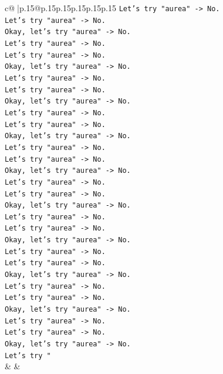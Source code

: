 \documentclass{article}
\begin{document}
{\begin{supertabular}{c@{$\;$}|p{.15\linewidth}@{}p{.15\linewidth}p{.15\linewidth}p{.15\linewidth}p{.15\linewidth}p{.15\linewidth}}
{{{\texttt{Let's try "aurea" {-}> No.} \\
\texttt{Let's try "aurea" {-}> No.} \\
\texttt{Okay, let's try "aurea" {-}> No.} \\
\texttt{Let's try "aurea" {-}> No.} \\
\texttt{Let's try "aurea" {-}> No.} \\
\texttt{Okay, let's try "aurea" {-}> No.} \\
\texttt{Let's try "aurea" {-}> No.} \\
\texttt{Let's try "aurea" {-}> No.} \\
\texttt{Okay, let's try "aurea" {-}> No.} \\
\texttt{Let's try "aurea" {-}> No.} \\
\texttt{Let's try "aurea" {-}> No.} \\
\texttt{Okay, let's try "aurea" {-}> No.} \\
\texttt{Let's try "aurea" {-}> No.} \\
\texttt{Let's try "aurea" {-}> No.} \\
\texttt{Okay, let's try "aurea" {-}> No.} \\
\texttt{Let's try "aurea" {-}> No.} \\
\texttt{Let's try "aurea" {-}> No.} \\
\texttt{Okay, let's try "aurea" {-}> No.} \\
\texttt{Let's try "aurea" {-}> No.} \\
\texttt{Let's try "aurea" {-}> No.} \\
\texttt{Okay, let's try "aurea" {-}> No.} \\
\texttt{Let's try "aurea" {-}> No.} \\
\texttt{Let's try "aurea" {-}> No.} \\
\texttt{Okay, let's try "aurea" {-}> No.} \\
\texttt{Let's try "aurea" {-}> No.} \\
\texttt{Let's try "aurea" {-}> No.} \\
\texttt{Okay, let's try "aurea" {-}> No.} \\
\texttt{Let's try "aurea" {-}> No.} \\
\texttt{Let's try "aurea" {-}> No.} \\
\texttt{Okay, let's try "aurea" {-}> No.} \\
\texttt{Let's try "} \\
            }
        }
    }
    & & \\ \\


\end{supertabular}}
\end{document}
